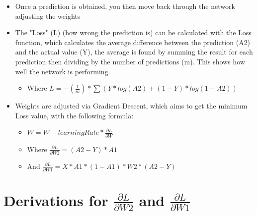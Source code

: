 \documentclass[10pt,a4paper]{article}
\begin{document}
\begin{itemize}
    \item Once a prediction is obtained, you then move back through the network adjusting the weights
    \item The "Loss" (L) (how wrong the prediction is) can be calculated with the Loss function, which calculates the average    difference between the prediction (A2) and the actual value (Y), the average is found by summing the result for each prediction then dividing by the number of predictions (m). This shows how well the network is performing.
    \begin{itemize}
        \item Where $L = -(\frac{1}{m}) * \sum(Y * log(A2) + (1-Y) * log(1-A2))$
    \end{itemize}
    \item Weights are adjusted via Gradient Descent, which aims to get the minimum Loss value, with the following formula:
    \begin{itemize}
        \item $W = W - learningRate * \frac{\partial{L}}{\partial{W}}$
        \item Where $\frac{\partial{L}}{\partial{W2}} = (A2-Y) * A1$
        \item And $\frac{\partial{L}}{\partial{W1}} = X * A1 * (1-A1) * W2 * (A2-Y)$
    \end{itemize}
\end{itemize}

\section{Derivations for $\frac{\partial{L}}{\partial{W2}}$ and $\frac{\partial{L}}{\partial{W1}}$}
\end{document}
